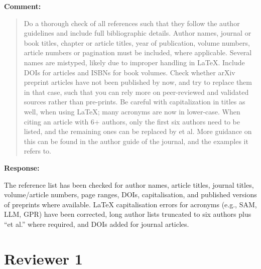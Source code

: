\documentclass[11pt,a4paper]{article}
\newenvironment{commentblock}{%
  \par\smallskip\noindent\textbf{Comment:}\par
  \begin{quote}\itshape\color{black}
}{%
  \end{quote}\smallskip
}
\newenvironment{responseblock}{%
  \par\smallskip\noindent\textbf{Response:}\par
  \begingroup\color{responsegreen}
}{%
  \endgroup\smallskip
}
\begin{document}
\begin{commentblock}
Do a thorough check of all references such that they follow the author guidelines and include full bibliographic details. Author names, journal or book titles, chapter or article titles, year of publication, volume numbers, article numbers or pagination must be included, where applicable. Several names are mistyped, likely due to improper handling in \LaTeX. Include DOIs for articles and ISBNs for book volumes. Check whether arXiv preprint articles have not been published by now, and try to replace them in that case, such that you can rely more on peer-reviewed and validated sources rather than pre-prints. Be careful with capitalization in titles as well, when using \LaTeX; many acronyms are now in lower-case. When citing an article with 6+ authors, only the first six authors need to be listed, and the remaining ones can be replaced by et al. More guidance on this can be found in the author guide of the journal, and the examples it refers to.
\end{commentblock}
\begin{responseblock}
The reference list has been checked for author names, article titles, journal titles, volume/article numbers, page ranges, DOIs, capitalisation, and published versions of preprints where available. \LaTeX{} capitalisation errors for acronyms (e.g., SAM, LLM, GPR) have been corrected, long author lists truncated to six authors plus ``et al.'' where required, and DOIs added for journal articles.
\end{responseblock}

\section*{Reviewer 1}
\end{document}
